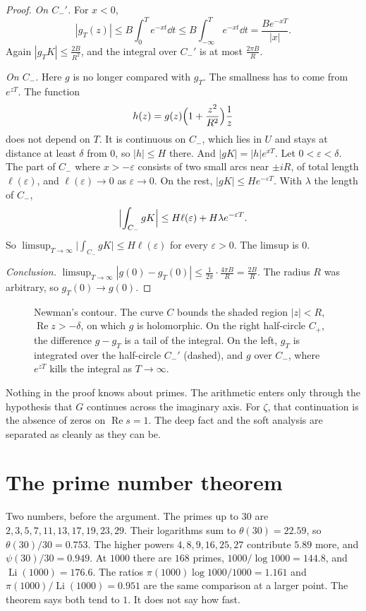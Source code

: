 \begin{proof}
\emph{On $C_-'$.} For $x<0$,
\[
|g_T(z)|\le B\int_0^Te^{-xt}\dd t\le B\int_{-\infty}^Te^{-xt}\dd t=\frac{Be^{-xT}}{|x|}.
\]
Again $|g_TK|\le\frac{2B}{R^2}$, and the integral over $C_-'$ is at most $\frac{2\pi B}R$.

\emph{On $C_-$.} Here $g$ is no longer compared with $g_T$. The smallness has to come from $e^{zT}$. The function
\[
h(z)=g(z)\Bigl(1+\frac{z^2}{R^2}\Bigr)\frac1z
\]
does not depend on $T$. It is continuous on $C_-$, which lies in $U$ and stays at distance at least $\delta$ from $0$, so $|h|\le H$ there. And $|gK|=|h|e^{xT}$. Let $0<\varepsilon<\delta$. The part of $C_-$ where $x>-\varepsilon$ consists of two small arcs near $\pm iR$, of total length $\ell(\varepsilon)$, and $\ell(\varepsilon)\to0$ as $\varepsilon\to0$. On the rest, $|gK|\le He^{-\varepsilon T}$. With $\lambda$ the length of $C_-$,
\[
\Bigl|\int_{C_-}gK\Bigr|\le H\ell(\varepsilon)+H\lambda e^{-\varepsilon T}.
\]
So $\limsup_{T\to\infty}\bigl|\int_{C_-}gK\bigr|\le H\ell(\varepsilon)$ for every $\varepsilon>0$. The limsup is $0$.

\emph{Conclusion.} $\limsup_{T\to\infty}|g(0)-g_T(0)|\le\frac1{2\pi}\cdot\frac{4\pi B}R=\frac{2B}R$. The radius $R$ was arbitrary, so $g_T(0)\to g(0)$.
\end{proof}

\begin{figure}[ht]
\centering
{}
\caption{Newman's contour. The curve $C$ bounds the shaded region $|z|<R$, $\operatorname{Re}z>-\delta$, on which $g$ is holomorphic. On the right half-circle $C_+$, the difference $g-g_T$ is a tail of the integral. On the left, $g_T$ is integrated over the half-circle $C_-'$ (dashed), and $g$ over $C_-$, where $e^{zT}$ kills the integral as $T\to\infty$.}
\label{fig:contour}
\end{figure}

\begin{beauty}
Nothing in the proof knows about primes. The arithmetic enters only through the hypothesis that $G$ continues across the imaginary axis. For $\zeta$, that continuation is the absence of zeros on $\operatorname{Re}s=1$. The deep fact and the soft analysis are separated as cleanly as they can be.
\end{beauty}

\section{The prime number theorem}

Two numbers, before the argument. The primes up to $30$ are $2,3,5,7,11,13,17,19,23,29$. Their logarithms sum to $\theta(30)=22.59$, so $\theta(30)/30=0.753$. The higher powers $4,8,9,16,25,27$ contribute $5.89$ more, and $\psi(30)/30=0.949$. At $1000$ there are $168$ primes, $1000/\log 1000=144.8$, and $\operatorname{Li}(1000)=176.6$. The ratios $\pi(1000)\log 1000/1000=1.161$ and $\pi(1000)/\operatorname{Li}(1000)=0.951$ are the same comparison at a larger point. The theorem says both tend to $1$. It does not say how fast.


